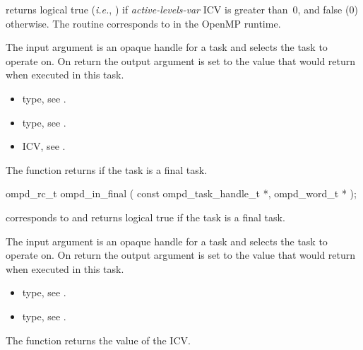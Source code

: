 \descr
{} returns logical true (\textit{i.e.}, )
if \emph{active-levels-var}
ICV is greater than~0, and false (0) otherwise.
The routine corresponds to  in the OpenMP runtime.

\argdesc
The input argument  is an opaque handle for a task and selects the task to operate on.
On return the output argument  is set to the value that  would return when
executed in this task.

\crossreferences
\begin{itemize}
	\item {} type, see .
	\item {} type, see .
	\item {} ICV, see .
\end{itemize}


\label{subsubsubsec:ompd_in_final}
\summary
The  function returns  if the task is a final task.

\format
\begin{cspecific}
\begin{ompSyntax}
ompd_rc_t ompd_in_final (
  const ompd_task_handle_t *,
  ompd_word_t *
);
\end{ompSyntax}
\end{cspecific}

\descr
{} corresponds to  and returns
logical true if the task is a final task.

\argdesc
The input argument  is an opaque handle for a task and selects the task to operate on.
On return the output argument  is set to the value that  would return when
executed in this task.

\crossreferences
\begin{itemize}
	\item {} type, see .
	\item {} type, see .
\end{itemize}


\label{subsubsubsec:ompd_get_dynamic}
\summary
The  function returns the value of the  ICV.

